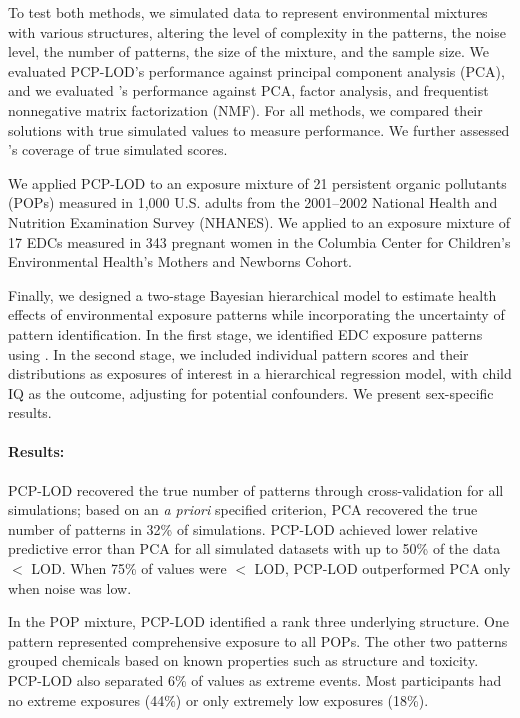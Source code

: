 {To test both methods, we simulated data to represent environmental mixtures with various structures, altering the level of complexity in the patterns, the noise level, the number of patterns, the size of the mixture, and the sample size. We evaluated PCP-LOD's performance against principal component analysis (PCA), and we evaluated \bnmfc's performance against PCA, factor analysis, and frequentist nonnegative matrix factorization (NMF). For all methods, we compared their solutions with true simulated values to measure performance. We further assessed \bnmfc's coverage of true simulated scores. 

We applied PCP-LOD to an exposure mixture of 21 persistent organic pollutants (POPs) measured in 1,000 U.S. adults from the 2001--2002 National Health and Nutrition Examination Survey (NHANES). We applied \bnmf to an exposure mixture of 17 EDCs measured in 343 pregnant women in the Columbia Center for Children’s Environmental Health's Mothers and Newborns Cohort. 

Finally, we designed a two-stage Bayesian hierarchical model to estimate health effects of environmental exposure patterns while incorporating the uncertainty of pattern identification. In the first stage, we identified EDC exposure patterns using \bnmfc. In the second stage, we included individual pattern scores and their distributions as exposures of interest in a hierarchical regression model, with child IQ as the outcome, adjusting for potential confounders. We present sex-specific results.

\paragraph{Results:}	
PCP-LOD recovered the true number of patterns through cross-validation for all simulations; based on an \textit{a priori} specified criterion, PCA recovered the true number of patterns in 32\% of simulations. PCP-LOD achieved lower relative predictive error than PCA for all simulated datasets with up to 50\% of the data $<$ LOD. When 75\% of values were $<$ LOD, PCP-LOD outperformed PCA only when noise was low.

In the POP mixture, PCP-LOD identified a rank three underlying structure. One pattern represented comprehensive exposure to all POPs. The other two patterns grouped chemicals based on known properties such as structure and toxicity. PCP-LOD also separated 6\% of values as extreme events. Most participants had no extreme exposures (44\%) or only extremely low exposures (18\%).

}
